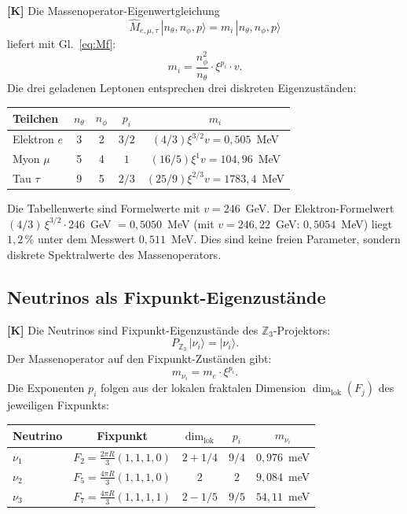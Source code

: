 \textbf{[K]} Die Massenoperator-Eigenwertgleichung
\begin{equation}
  \hat{M}_{e,\mu,\tau}\,|n_\theta, n_\phi, p\rangle
  = m_i\,|n_\theta, n_\phi, p\rangle
  \label{eq:meigen}
\end{equation}
liefert mit Gl.~\eqref{eq:Mf}:
\begin{equation}
  m_i = \frac{n_\phi^2}{n_\theta} \cdot \xi^{p_i} \cdot v.
  \label{eq:masse_eigen}
\end{equation}
Die drei geladenen Leptonen entsprechen drei diskreten
Eigenzuständen:
\begin{center}
\begin{tabular}{lcccc}
\toprule
Teilchen & $n_\theta$ & $n_\phi$ & $p_i$ & $m_i$ \\
\midrule
Elektron $e$  & 3 & 2 & $3/2$ & $(4/3)\xi^{3/2}v = 0{,}505$~MeV \\
Myon $\mu$    & 5 & 4 & $1$   & $(16/5)\xi^1 v = 104{,}96$~MeV \\
Tau $\tau$    & 9 & 5 & $2/3$ & $(25/9)\xi^{2/3}v = 1783{,}4$~MeV \\
\bottomrule
\end{tabular}
\end{center}
Die Tabellenwerte sind Formelwerte mit $v = 246$~GeV. Der Elektron-Formelwert
$(4/3)\,\xi^{3/2}\cdot 246$~GeV $= 0{,}5050$~MeV (mit $v = 246{,}22$~GeV: $0{,}5054$~MeV)
liegt $1{,}2\,\%$ unter dem Messwert $0{,}511$~MeV.
Dies sind keine freien Parameter, sondern diskrete Spektralwerte des
Massenoperators.

\subsection{Neutrinos als Fixpunkt-Eigenzustände}

\textbf{[K]} Die Neutrinos sind Fixpunkt-Eigenzustände des
$\mathbb{Z}_3$-Projektors:
\begin{equation}
  P_{\mathbb{Z}_3}\,|\nu_i\rangle = |\nu_i\rangle.
  \label{eq:nufix}
\end{equation}
Der Massenoperator auf den Fixpunkt-Zuständen gibt:
\begin{equation}
  m_{\nu_i} = m_e \cdot \xi^{p_i}.
  \label{eq:nu_masse}
\end{equation}
Die Exponenten $p_i$ folgen aus der lokalen fraktalen Dimension
$\dim_{\mathrm{lok}}(F_j)$ des jeweiligen Fixpunkts:
\begin{center}
\begin{tabular}{lcccc}
\toprule
Neutrino & Fixpunkt & $\dim_{\mathrm{lok}}$ & $p_i$ & $m_{\nu_i}$ \\
\midrule
$\nu_1$ & $F_2 = \tfrac{2\pi R}{3}(1,1,1,0)$
  & $2 + 1/4$ & $9/4$ & $0{,}976$~meV \\
$\nu_2$ & $F_5 = \tfrac{4\pi R}{3}(1,1,1,0)$
  & $2$       & $2$   & $9{,}084$~meV \\
$\nu_3$ & $F_7 = \tfrac{4\pi R}{3}(1,1,1,1)$
  & $2 - 1/5$ & $9/5$ & $54{,}11$~meV \\
\bottomrule
\end{tabular}
\end{center}


